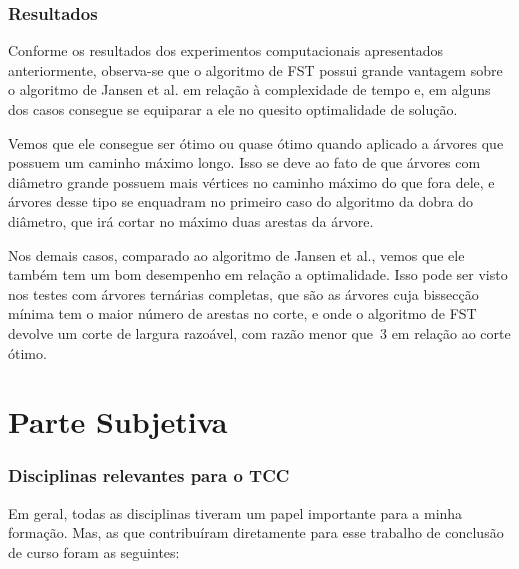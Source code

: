 \documentclass[a4paper,12pt]{article}
\begin{document}
\section {Resultados}
Conforme os resultados dos experimentos computacionais
 apresentados anteriormente, observa-se
que o algoritmo de FST possui grande vantagem sobre o algoritmo
de Jansen et al. em relação à complexidade de tempo e, em alguns 
dos casos consegue se equiparar a ele no quesito optimalidade de
solução.

Vemos que ele consegue ser ótimo ou quase ótimo quando aplicado
a árvores que possuem um caminho máximo longo. 
Isso se deve ao
fato de que árvores com diâmetro grande possuem 
mais vértices no caminho máximo do que fora dele, e
árvores desse tipo se enquadram no primeiro caso do algoritmo da 
dobra do diâmetro, que irá cortar no máximo duas arestas da árvore.

Nos demais casos, comparado ao algoritmo de Jansen et al.,
vemos que ele também tem um bom desempenho em relação a 
optimalidade. 
Isso pode ser visto nos testes com árvores ternárias 
completas,
que são as árvores cuja bissecção mínima
tem o maior número de arestas no corte, e onde o algoritmo
de FST devolve um corte de largura razoável, com razão
menor que~3 em relação ao corte ótimo.


\newpage



\newpage

\part{Parte Subjetiva}
\newpage


\section{Disciplinas relevantes para o TCC}
Em geral, todas as disciplinas tiveram um papel importante
para a minha formação. Mas, as que contribuíram
diretamente para esse trabalho de conclusão de curso
 foram as seguintes:
\end{document}
